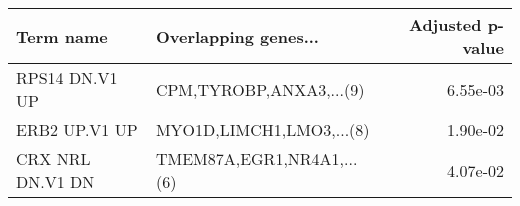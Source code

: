 \begin{tabular}{llr}
\toprule
       Term name &      Overlapping genes... &  Adjusted p-value \\
\midrule
  RPS14 DN.V1 UP &   CPM,TYROBP,ANXA3,...(9) &          6.55e-03 \\
   ERB2 UP.V1 UP &  MYO1D,LIMCH1,LMO3,...(8) &          1.90e-02 \\
CRX NRL DN.V1 DN & TMEM87A,EGR1,NR4A1,...(6) &          4.07e-02 \\
\bottomrule
\end{tabular}
